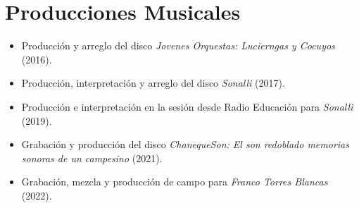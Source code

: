 \documentclass[a4paper,10pt]{article}
\begin{document}
\section*{Producciones Musicales}
\begin{itemize}[left=0pt]
    \item Producción y arreglo del disco \textit{Jovenes Orquestas: Lucierngas y Cocuyos} (2016).
    \item Producción, interpretación y arreglo del disco \textit{Sonalli} (2017).
    \item Producción e interpretación en la sesión desde Radio Educación para \textit{Sonalli} (2019).
    \item Grabación y producción del disco \textit{ChanequeSon: El son redoblado memorias sonoras de un campesino} (2021).
    \item Grabación, mezcla y producción de campo para \textit{Franco Torres Blancas} (2022).
\end{itemize}
\end{document}
